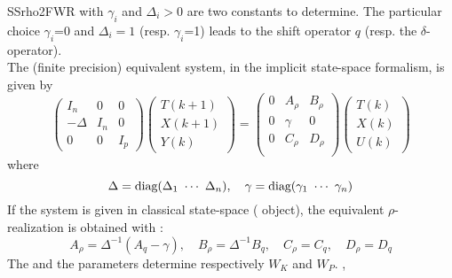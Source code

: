 \begin{command}{SSrho2FWR}
with $\gamma_{i}$ and $\Delta_{i}>0$ are two constants to determine. The particular choice $\gamma_{i}$=0 and $\Delta_{i}=1$ (resp. $\gamma_{i}$=1) leads to the shift operator $q$ (resp. the $\delta$-operator). \\
The (finite precision) equivalent system, in the implicit state-space formalism, is given by
\begin{equation}\label{eq:SSrho2FWR:implicit_rho}
\begin{pmatrix}
I_{n} & 0 & 0\\
-\Delta & I_{n} & 0\\
0 & 0 & I_{p}
\end{pmatrix}
\begin{pmatrix}
T(k+1)\\
X(k+1)\\
Y(k)
\end{pmatrix}
=
\begin{pmatrix}
0 & A_{\rho} & B_{\rho}\\
0 & \gamma & 0\\
0 & C_{\rho} & D_{\rho}\\
\end{pmatrix}
\begin{pmatrix}
T(k)\\
X(k)\\
U(k)
\end{pmatrix}
\end{equation}
where
\begin{equation*}
\Delta=\hbox{diag}(\Delta_{1}~\cdots~\Delta_{n}),\quad\gamma=\hbox{diag}(\gamma_{1}~\cdots~\gamma_{n})
\end{equation*}
If the system is given in classical state-space ( object), the equivalent $\rho$-realization is obtained with :
\begin{equation}
A_{\rho} = \Delta^{-1}(A_q-\gamma), \quad B_{\rho} = \Delta^{-1}B_q, \quad C_{\rho}=C_q, \quad D_{\rho} = D_q
\end{equation}
The  and the  parameters determine respectively $W_K$ and $W_P$.
, 
\end{command}


